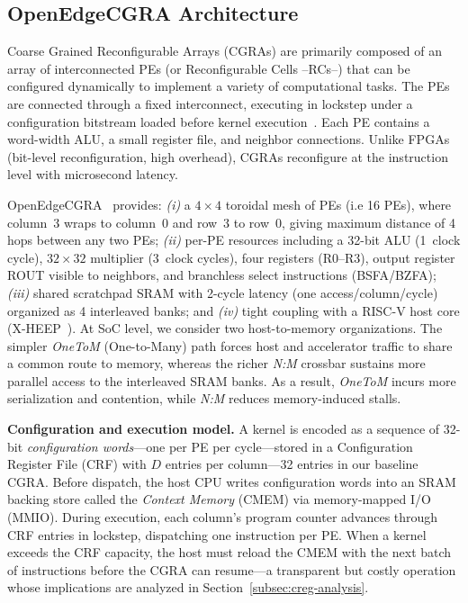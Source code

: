 \subsection{OpenEdgeCGRA Architecture}
\label{subsec:cgra-basics}

Coarse Grained Reconfigurable Arrays (CGRAs) are primarily composed of an array of interconnected
PEs (or Reconfigurable Cells --RCs--) that can be configured dynamically to implement a variety of computational tasks. The PEs are connected through a fixed interconnect, executing in lockstep under a configuration bitstream loaded before kernel execution~\cite{cgra-survey}. Each PE contains a word-width ALU, a small register file, and neighbor connections. Unlike FPGAs (bit-level reconfiguration, high overhead), CGRAs reconfigure at the instruction level with microsecond latency.

OpenEdgeCGRA~\cite{openedge-cgra} provides: \textit{(i)} a $4\times4$ toroidal mesh of PEs (i.e 16 PEs),  where column~3 wraps to column~0 and row~3 to row~0, giving maximum distance of 4 hops between any two PEs; \textit{(ii)} per-PE resources including a 32-bit ALU (1~clock cycle), $32\!\times\!32$ multiplier (3~clock cycles), four registers (R0--R3), output register ROUT visible to neighbors, and branchless select instructions (BSFA/BZFA); \textit{(iii)} shared scratchpad SRAM with 2-cycle latency (one access/column/cycle) organized as 4 interleaved banks; and \textit{(iv)} tight coupling with a RISC-V host core (X-HEEP~\cite{xheep}). At SoC level, we consider two host-to-memory organizations. The simpler \textit{OneToM} (One-to-Many) path forces host and accelerator traffic to share a common route to memory, whereas the richer \textit{N:M} crossbar sustains more parallel access to the interleaved SRAM banks. As a result, \textit{OneToM} incurs more serialization and contention, while \textit{N:M} reduces memory-induced stalls.

\textbf{Configuration and execution model.} A kernel is encoded as a sequence of 32-bit \emph{configuration words}---one per PE per cycle---stored in a Configuration Register File (CRF) with $D$ entries per column---32 entries in our baseline CGRA. Before dispatch, the host CPU writes configuration words into an SRAM backing store called the \emph{Context Memory} (CMEM) via memory-mapped I/O (MMIO). During execution, each column's program counter advances through CRF entries in lockstep, dispatching one instruction per PE. When a kernel exceeds the CRF capacity, the host must reload the CMEM with the next batch of instructions before the CGRA can resume---a transparent but costly operation whose implications are analyzed in Section~\ref{subsec:creg-analysis}.

